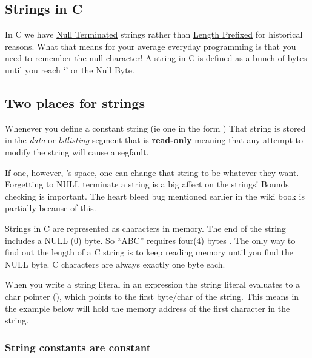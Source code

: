 \subsection{Strings in C}

In C we have
\href{https://en.wikipedia.org/wiki/Null-terminated_string}{Null
	Terminated} strings rather than
\href{https://en.wikipedia.org/wiki/String_(computer_science)\#Length-prefixed}{Length
	Prefixed} for historical reasons. What that means for your average
everyday programming is that you need to remember the null character! A
string in C is defined as a bunch of bytes until you reach `\0' or the
Null Byte.

\subsection{Two places for strings}\label{two-places-for-strings}

Whenever you define a constant string (ie one in the form ) That string is stored in the \emph{data} or \emph{lstlisting} segment that is \textbf{read-only} meaning that any attempt to modify the string will cause a segfault.

If one, however, 's space, one can change that string to be whatever they want. Forgetting to NULL terminate a string is a big affect on the strings! Bounds checking is important. The heart bleed bug mentioned earlier in the wiki book is partially because of this.

Strings in C are represented as characters in memory. The end of the string includes a NULL (0) byte. So ``ABC'' requires four(4) bytes .
The only way to find out the length of a C string is to keep reading memory until you find the NULL byte. C characters are always exactly one byte each.

When you write a string literal  in an expression the string literal evaluates to a char pointer (), which points to the first byte/char of the string. This means  in the example below will hold the memory address of the first character in the string.

\subsubsection{String constants are constant}

